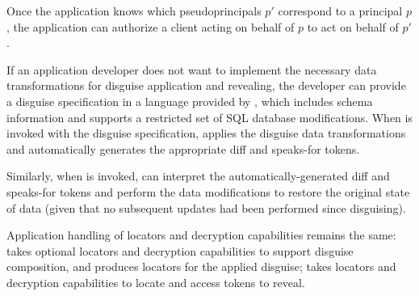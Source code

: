 Once the application knows which pseudoprincipals $p'$ correspond to a principal $p$, the application can
authorize a client acting on behalf of $p$ to act on behalf of $p'$.

If an application developer does not want to implement the necessary data transformations for disguise
application and revealing, the developer can provide a disguise specification in a language provided
by \sys, which includes schema information and supports a restricted set of SQL database
modifications. When  is invoked with the disguise specification, \sys applies the
disguise data transformations and automatically generates the appropriate diff and speaks-for tokens.

Similarly, when  is invoked, \sys can interpret the automatically-generated diff and
speaks-for tokens and perform the data modifications to restore the original state of data (given
that no subsequent updates had been performed since disguising).

Application handling of locators and decryption capabilities remains the same: 
takes optional locators and decryption capabilities to support disguise composition, and produces
locators for the applied disguise;  takes locators and decryption capabilities to
locate and access tokens to reveal.

